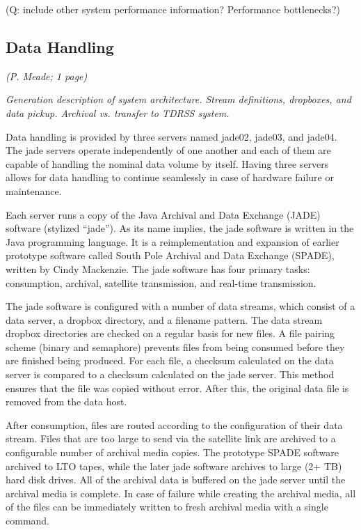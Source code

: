 (Q: include other system performance information?  Performance bottlenecks?)

\subsection{Data Handling}
\textsl{(P. Meade; 1 page)}

\textsl{Generation description of system architecture.  Stream definitions, dropboxes,
and data pickup.  Archival vs. transfer to TDRSS system.  }

Data handling is provided by three servers named jade02, jade03, and jade04. The jade servers operate independently of one another and 
each of them are capable of handling the nominal data volume by itself. Having three servers allows for data handling to continue seamlessly 
in case of hardware failure or maintenance.

Each server runs a copy of the Java Archival and Data Exchange (JADE) software (stylized “jade”). As its name implies, the jade software 
is written in the Java programming language. It is a reimplementation and expansion of earlier prototype software called South Pole Archival
and Data Exchange (SPADE), written by Cindy Mackenzie. The jade software has four primary tasks: consumption, archival, satellite transmission, and real-time
transmission.

The jade software is configured with a number of data streams, which consist of a data server, a dropbox directory, and a filename pattern. 
The data stream dropbox directories are checked on a regular basis for new files. A file pairing scheme (binary and semaphore) prevents files 
from being consumed before they are finished being produced. For each file, a checksum calculated on the data server is compared to a checksum 
calculated on the jade server. This method ensures that the file was copied without error. After this, the original data file is removed from the data host.

After consumption, files are routed according to the configuration of their data stream. Files that are too large to send via the satellite link are archived to
a configurable number of archival media copies. The prototype SPADE software archived to LTO tapes, while the later jade software archives to large (2+ TB) hard
disk drives. All of the archival data is buffered on the jade server until the archival media is complete. In case of failure while creating the archival media, 
all of the files can be immediately written to fresh archival media with a single command.

